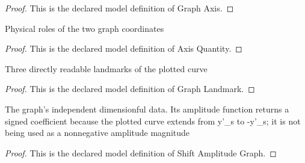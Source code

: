 \begin{proof}
  This is the declared model definition of Graph Axis.
\end{proof}
\begin{definition}
  \label{def:physics:phyx-mini-0303:phyxminiproblems-problemphyxmini0303-axisquantity}
  Physical roles of the two graph coordinates
\end{definition}
\begin{proof}
  This is the declared model definition of Axis Quantity.
\end{proof}
\begin{definition}
  \label{def:physics:phyx-mini-0303:phyxminiproblems-problemphyxmini0303-graphlandmark}
  Three directly readable landmarks of the plotted curve
\end{definition}
\begin{proof}
  This is the declared model definition of Graph Landmark.
\end{proof}
\begin{definition}
  \label{def:physics:phyx-mini-0303:phyxminiproblems-problemphyxmini0303-shiftamplitudegraph}
  The graph's independent dimensionful data. Its amplitude function returns a signed coefficient because the plotted curve extends from y'\_s to -y'\_s; it is not being used as a nonnegative amplitude magnitude
\end{definition}
\begin{proof}
  This is the declared model definition of Shift Amplitude Graph.
\end{proof}
